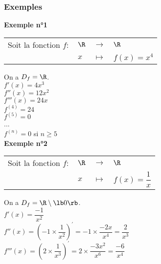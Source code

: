 \subsubsection{Exemples}

\textbf{Exemple n°1} \\

\begin{tabular}{llll}
Soit la fonction $f :$ & $\R$ & $\longrightarrow$ & $\R$ \\
& $x$ & $\longmapsto$ & $f(x) = x^4$ \\
\end{tabular}

\vspace*{.3cm}

On a $D_f = \R$. \\

$f' \left(x\right) = 4x^3$ \\
$f'' \left(x\right) = 12 x^2$ \\
$f'''\left(x\right) = 24x$ \\
$f^{(4)} = 24$ \\
$f^{(5)} = 0$ \\
... \\
$f^{(n)} = 0$ si $n \geqslant 5$ \\

\textbf{Exemple n°2} \\

\begin{tabular}{llll}
Soit la fonction $f :$ & $\R$ & $\longrightarrow$ & $\R$ \\
& $x$ & $\longmapsto$ & $f(x) = \dfrac{1}{x}$ \\
\end{tabular}

\vspace*{.3cm}

On a $D_f = \R \setminus \lb 0 \rb$. \\

$f' \left(x\right) = \dfrac{-1}{x^2}$ \vspace*{.3cm} \\

$f''\left(x\right) = \left(-1 \times \dfrac{1}{x^2}\right)^{'} = -1 \times \dfrac{-2x}{x^4} = \dfrac{2}{x^3}$ \vspace*{.3cm} \\

$f''' \left(x\right) = \left(2 \times \dfrac{1}{x^3}\right)^{'} = 2 \times \dfrac{-3x^2}{x^6} = \dfrac{-6}{x^4}$ \vspace*{.3cm} \\

